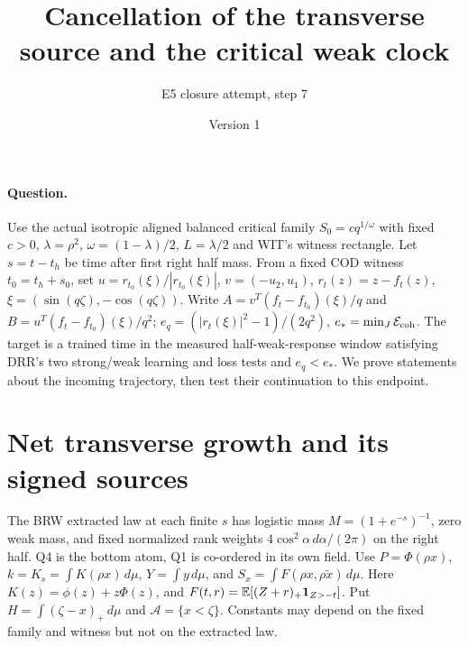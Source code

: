 \documentclass[11pt]{article}
\title{Cancellation of the transverse source and the critical weak clock}
\author{E5 closure attempt, step 7}\date{Version 1}
\newcommand{\dd}{\,d}\newcommand{\E}{\mathbb E}
\begin{document}
\maketitle

\paragraph{Question.}
Use the actual isotropic aligned balanced critical family
$S_0=cq^{1/\omega}$ with fixed $c>0$, $\lambda=\rho^2$,
$\omega=(1-\lambda)/2$, $L=\lambda/2$ and WIT's witness rectangle.
Let $s=t-t_h$ be time after first right half mass. From a fixed COD
witness $t_0=t_h+s_0$, set $u=r_{t_0}(\xi)/|r_{t_0}(\xi)|$,
$v=(-u_2,u_1)$, $r_t(z)=z-f_t(z)$,
$\xi=(\sin(q\zeta),-\cos(q\zeta))$. Write
$A=v^T(f_t-f_{t_0})(\xi)/q$ and $B=u^T(f_t-f_{t_0})(\xi)/q^2$;
$e_q=(|r_t(\xi)|^2-1)/(2q^2)$, $e_*=\min_J\mathcal E_{\rm coh}$.
The target is a trained time in the measured half-weak-response
window satisfying DRR's two strong/weak learning and loss tests and
$e_q<e_*$. We prove statements about the incoming trajectory,
then test their continuation to this endpoint.

\section{Net transverse growth and its signed sources}
The BRW extracted law at each finite $s$ has logistic mass
$M=(1+e^{-s})^{-1}$, zero weak mass, and fixed normalized rank
weights $4\cos^2\alpha\,d\alpha/(2\pi)$ on the right half.
Q4 is the bottom atom, Q1 is co-ordered in its own field.
Use $P=\Phi(\rho x)$, $k=K_s=\int K(\rho x)\dd\mu$,
$Y=\int y\dd\mu$, and $S_x=\int F(\rho x,\rho\tilde x)\dd\mu$.
Here $K(z)=\phi(z)+z\Phi(z)$, and $F(t,r)=\E[(Z+r)_+
{\bf1}_{Z>-t}]$. Put $H=\int(\zeta-x)_+\dd\mu$ and
$\mathcal A=\{x<\zeta\}$. Constants may depend on the fixed family
and witness but not on the extracted law.
\end{document}
